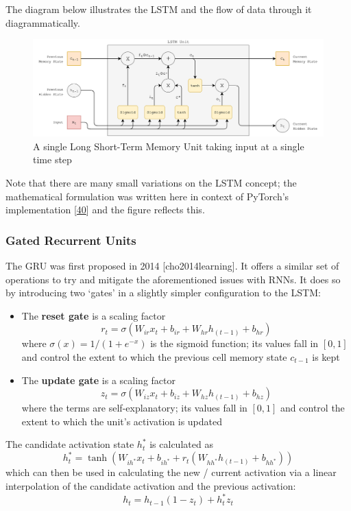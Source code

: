 \documentclass[12pt,]{article}
\providecommand{\tightlist}{%
  \setlength{\itemsep}{0pt}\setlength{\parskip}{0pt}}
\begin{document}
The diagram below illustrates the LSTM and the flow of data through it
diagrammatically.

\begin{figure}
\centering
\includegraphics{Images/lstm.png}
\caption{A single Long Short-Term Memory Unit taking input at a single
time step}
\end{figure}

Note that there are many small variations on the LSTM concept; the
mathematical formulation was written here in context of PyTorch's
implementation {[}\protect\hyperlink{ref-pytorchlstm}{40}{]} and the
figure reflects this.

\hypertarget{gated-recurrent-units}{%
\subsubsection{Gated Recurrent Units}\label{gated-recurrent-units}}

The GRU was first proposed in 2014 {[}cho2014learning{]}. It offers a
similar set of operations to try and mitigate the aforementioned issues
with RNNs. It does so by introducing two `gates' in a slightly simpler
configuration to the LSTM:

\begin{itemize}
\tightlist
\item
  The \textbf{reset gate} is a scaling factor
  \[r_t = \sigma(W_{ir} x_t + b_{ir} + W_{hr} h_{(t-1)} + b_{hr})\]
  where \(\sigma(x) = 1 / (1 + e^{-x})\) is the sigmoid function; its
  values fall in \([0,1]\) and control the extent to which the previous
  cell memory state \(c_{t-1}\) is kept
\item
  The \textbf{update gate} is a scaling factor
  \[z_t = \sigma(W_{iz} x_t + b_{iz} + W_{hz} h_{(t-1)} + b_{hz})\]
  where the terms are self-explanatory; its values fall in \([0,1]\) and
  control the extent to which the unit's activation is updated
\end{itemize}

The candidate activation state \(h_t^*\) is calculated as
\[h_t^* = \tanh(W_{ih^*} x_t + b_{ih^*} + r_t (W_{hh^*} h_{(t-1)} + b_{hh^*}))\]
which can then be used in calculating the new / current activation via a
linear interpolation of the candidate activation and the previous
activation: \[h_t = h_{t-1} (1 - z_t) + h_t^* z_t\]
\end{document}
